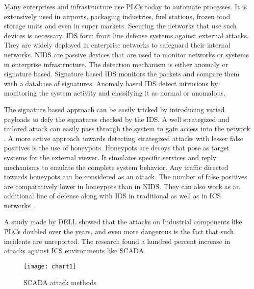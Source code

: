 \documentclass[article,msc=informatik,type=msc,colorback,accentcolor=tud9c]{tudthesis}
\begin{document}
   \vspace{3mm}
   Many enterprises and infrastructure use \ac{PLC}s today to automate processes. It is extensively used in airports, packaging industries, fuel stations, frozen food storage units and even in super markets. Securing the networks that use such devices is necessary. \ac{IDS} form front line defense systems against external attacks. They are widely deployed in enterprise networks to safeguard their internal networks. \ac{NIDS}\cite{1377213} are passive devices that  are used to monitor networks or systems in enterprise infrastructure. The detection mechanism is either anomaly or signature based. Signature\cite{wu2008signature} based IDS monitors the packets and compare them with a database of signatures. Anomaly\cite{garcia2009anomaly} based IDS detect intrusions by monitoring the system activity and classifying it as normal or anomalous. 
   
   
   \vspace{3mm}
   The signature based approach can be easily tricked by introducing varied payloads to defy the signatures  checked by the \ac{IDS}. A well strategized and tailored attack can easily pass through the system to gain access into the network \cite{kendall1999database}. A more active approach towards detecting strategized attacks with lesser false positives is the use of honeypots\cite{Provos:2004:VHF:1251375.1251376}. Honeypots are decoys that pose as target systems for the external viewer. It simulates specific services and reply mechanisms to emulate the complete system behavior. Any traffic directed towards honeypots can be considered as an attack. The number of false positives are comparatively lower in honeypots than in \ac{NIDS}. They can also work as an additional line of defense along with \ac{IDS} in traditional as well as in \ac{ICS} networks~\cite{winn2015constructing}.
   
   
   \vspace{3mm} 
   A study made by DELL\cite{DELLSecurityPoster2015} showed that the attacks on Industrial components like \ac{PLC}s doubled over the years, and even more dangerous is the fact that such incidents are unreported. The research found a hundred percent increase in attacks against \ac{ICS} environments like \ac{SCADA}.
   
        
    \begin{figure}[ht]
            \centering
            \texttt{[image: chart1]}
            \caption[SCADA Attack Types]{\label{f:SCADA Attack}SCADA attack methods\cite{DELLSecurityPoster2015}}
            \end{figure}  
            
\end{document}
